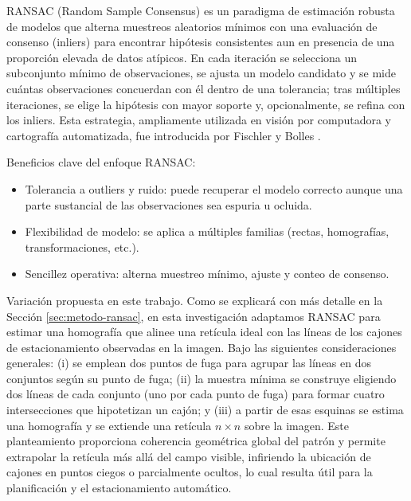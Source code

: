 \noindent
RANSAC (Random Sample Consensus) es un paradigma de estimación robusta de modelos que alterna 
muestreos aleatorios mínimos con una evaluación de consenso (inliers) para encontrar hipótesis 
consistentes aun en presencia de una proporción elevada de datos atípicos. 
En cada iteración se selecciona un subconjunto mínimo de observaciones, se ajusta un modelo candidato 
y se mide cuántas observaciones concuerdan con él dentro de una tolerancia; tras múltiples iteraciones, 
se elige la hipótesis con mayor soporte y, opcionalmente, se refina con los inliers. 
Esta estrategia, ampliamente utilizada en visión por computadora y cartografía automatizada, 
fue introducida por Fischler y Bolles \cite{fischler1981ransac}.

\noindent
Beneficios clave del enfoque RANSAC:
\begin{itemize}
	\item Tolerancia a outliers y ruido: puede recuperar el modelo correcto aunque una parte sustancial de las observaciones sea espuria u ocluida.
	\item Flexibilidad de modelo: se aplica a múltiples familias (rectas, homografías, transformaciones, etc.).
	\item Sencillez operativa: alterna muestreo mínimo, ajuste y conteo de consenso.
\end{itemize}

\noindent
Variación propuesta en este trabajo. 
Como se explicará con más detalle en la Sección \ref{sec:metodo-ransac}, 
en esta investigación adaptamos RANSAC para estimar una homografía que alinee una retícula ideal 
con las líneas de los cajones de estacionamiento observadas en la imagen. 
Bajo las siguientes consideraciones generales: 
(i) se emplean dos puntos de fuga para agrupar las líneas en dos conjuntos según su punto de fuga; 
(ii) la muestra mínima se construye eligiendo dos líneas de cada conjunto (uno por cada punto de fuga) para formar cuatro intersecciones 
que hipotetizan un cajón; y 
(iii) a partir de esas esquinas se estima una homografía y se extiende una retícula \(n\times n\) 
sobre la imagen. Este planteamiento proporciona coherencia geométrica global del patrón 
y permite extrapolar la retícula más allá del campo visible, infiriendo la ubicación de cajones 
en puntos ciegos o parcialmente ocultos, lo cual resulta útil para la planificación 
y el estacionamiento automático.
